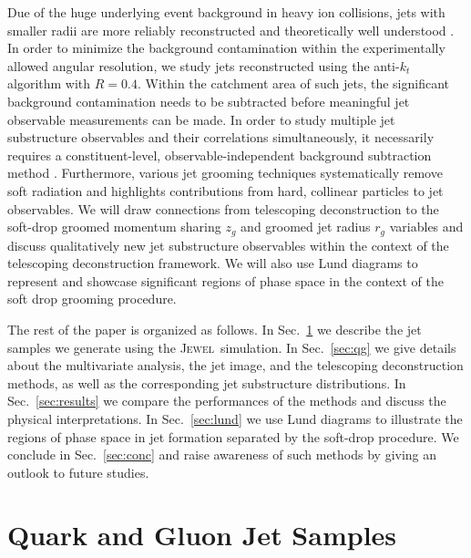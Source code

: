 \documentclass[notoc,preprintnumbers]{JHEP3}
\newcommand{\jw}{\textsc{Jewel}~}
\begin{document}
Due of the huge underlying event background in heavy ion collisions, jets with smaller radii are more reliably reconstructed and theoretically well understood \cite{Dasgupta:2014yra,Chien:2015cka,Becher:2015hka,Kang:2016mcy}. In order to minimize the background contamination within the experimentally allowed angular resolution, we study jets reconstructed using the anti-$k_t$ algorithm \cite{Cacciari:2008gp} with $R=0.4$. Within the catchment area of such jets, the significant background contamination needs to be subtracted before meaningful jet observable measurements can be made. In order to study multiple jet substructure observables and their correlations simultaneously, it necessarily requires a constituent-level, observable-independent background subtraction method \cite{Soyez:2012hv,Cacciari:2014gra,Berta:2014eza,Bertolini:2014bba,Komiske:2017ubm}. Furthermore, various jet grooming techniques \cite{Ellis:2009su,Ellis:2009me,Krohn:2009th,Dasgupta:2013ihk,Larkoski:2014wba} systematically remove soft radiation and highlights contributions from hard, collinear particles to jet observables. We will draw connections from telescoping deconstruction to the soft-drop groomed momentum sharing $z_g$ and groomed jet radius $r_g$ variables \cite{Larkoski:2014wba} and discuss qualitatively new jet substructure observables within the context of the telescoping deconstruction framework. We will also use Lund diagrams \cite{Andersson1989,Salam:2016yht} to represent and showcase significant regions of phase space in the context of the soft drop grooming procedure.

The rest of the paper is organized as follows. In Sec.~\ref{sec:sample} we describe the jet samples we generate using the \jw simulation. In Sec.~\ref{sec:qg} we give details about the multivariate analysis, the jet image, and the telescoping deconstruction methods, as well as the corresponding jet substructure distributions. In Sec.~\ref{sec:results} we compare the performances of the methods and discuss the physical interpretations. In Sec.~\ref{sec:lund} we use Lund diagrams to illustrate the regions of phase space in jet formation separated by the soft-drop procedure. We conclude in Sec.~\ref{sec:conc} and raise awareness of such methods by giving an outlook to future studies.


\section{Quark and Gluon Jet Samples}
\label{sec:sample}
\end{document}
